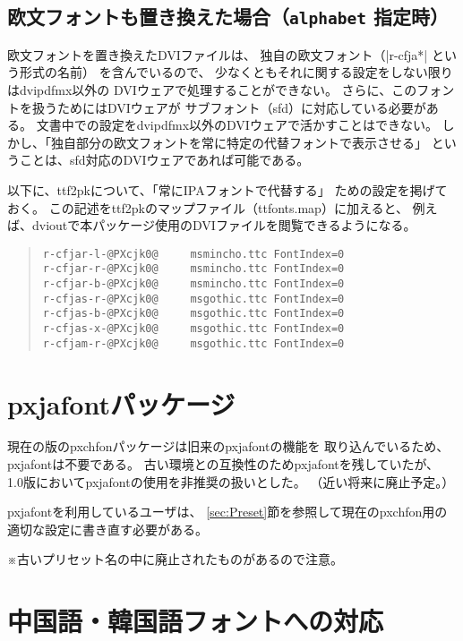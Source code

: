 \documentclass[uplatex,dvipdfmx,a4paper]{jsarticle}
\newcommand{\Pkg}[1]{\textsf{#1}}
\newcommand{\Note}{\par\noindent ※}
\begin{document}
\subsection{欧文フォントも置き換えた場合（\texttt{alphabet} 指定時）}

欧文フォントを置き換えたDVIファイルは、
独自の欧文フォント（|r-cfja*| という形式の名前）
を含んでいるので、
少なくともそれに関する設定をしない限りはdvipdfmx以外の
DVIウェアで処理することができない。
さらに、このフォントを扱うためにはDVIウェアが
サブフォント（sfd）に対応している必要がある。
文書中での設定をdvipdfmx以外のDVIウェアで活かすことはできない。
しかし、「独自部分の欧文フォントを常に特定の代替フォントで表示させる」
ということは、sfd対応のDVIウェアであれば可能である。

以下に、ttf2pkについて、「常にIPAフォントで代替する」
ための設定を掲げておく。
この記述をttf2pkのマップファイル（ttfonts.map）に加えると、
例えば、dvioutで本パッケージ使用のDVIファイルを閲覧できるようになる。

\begin{quote}\small\begin{verbatim}
r-cfjar-l-@PXcjk0@     msmincho.ttc FontIndex=0
r-cfjar-r-@PXcjk0@     msmincho.ttc FontIndex=0
r-cfjar-b-@PXcjk0@     msmincho.ttc FontIndex=0
r-cfjas-r-@PXcjk0@     msgothic.ttc FontIndex=0
r-cfjas-b-@PXcjk0@     msgothic.ttc FontIndex=0
r-cfjas-x-@PXcjk0@     msgothic.ttc FontIndex=0
r-cfjam-r-@PXcjk0@     msgothic.ttc FontIndex=0
\end{verbatim}\end{quote}

\section{pxjafontパッケージ}

現在の版の\Pkg{pxchfon}パッケージは旧来の\Pkg{pxjafont}の機能を
取り込んでいるため、\Pkg{pxjafont}は不要である。
古い環境との互換性のため\Pkg{pxjafont}を残していたが、
1.0版において\Pkg{pxjafont}の使用を非推奨の扱いとした。
（近い将来に廃止予定。）

\Pkg{pxjafont}を利用しているユーザは、
\ref{sec:Preset}節を参照して現在の\Pkg{pxchfon}用の
適切な設定に書き直す必要がある。

\Note 古いプリセット名の中に廃止されたものがあるので注意。

\section{中国語・韓国語フォントへの対応}
\label{sec:Non-Japanese}
\end{document}
